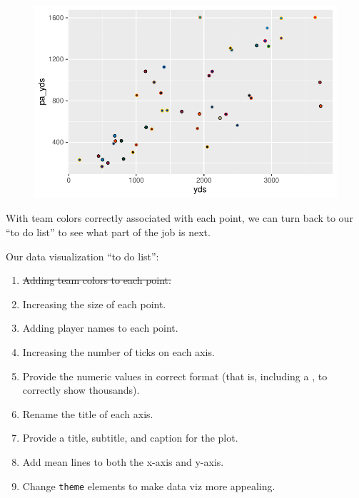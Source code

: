 \documentclass[
  letterpaper,
]{krantz}
\begin{document}
\begin{figure}[H]

{\centering \includegraphics{04-nfl-analytics-visualization_files/figure-pdf/adding-shape-21-to-plot-1.pdf}

}

\end{figure}

With team colors correctly associated with each point, we can turn back
to our ``to do list'' to see what part of the job is next.

\begin{tcolorbox}[enhanced jigsaw, left=2mm, toprule=.15mm, opacitybacktitle=0.6, leftrule=.75mm, bottomrule=.15mm, colbacktitle=quarto-callout-note-color!10!white, breakable, colback=white, bottomtitle=1mm, toptitle=1mm, title=\textcolor{quarto-callout-note-color}{\faInfo}\hspace{0.5em}{Note}, coltitle=black, titlerule=0mm, arc=.35mm, opacityback=0, colframe=quarto-callout-note-color-frame, rightrule=.15mm]

Our data visualization ``to do list'':

\begin{enumerate}
\def\labelenumi{\arabic{enumi}.}
\item
  \st{Adding team colors to each point.}
\item
  Increasing the size of each point.
\item
  Adding player names to each point.
\item
  Increasing the number of ticks on each axis.
\item
  Provide the numeric values in correct format (that is, including a ,
  to correctly show thousands).
\item
  Rename the title of each axis.
\item
  Provide a title, subtitle, and caption for the plot.
\item
  Add mean lines to both the x-axis and y-axis.
\item
  Change \texttt{theme} elements to make data viz more appealing.
\end{enumerate}

\end{tcolorbox}
\end{document}
